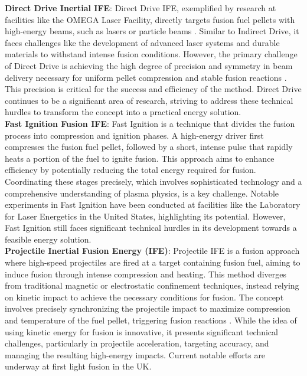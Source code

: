 \textbf{Direct Drive Inertial IFE}: Direct Drive IFE, exemplified by research at facilities like the OMEGA Laser Facility, directly targets fusion fuel pellets with high-energy beams, such as lasers or particle beams \cite{soures1996direct}. Similar to Indirect Drive, it faces challenges like the development of advanced laser systems and durable materials to withstand intense fusion conditions. However, the primary challenge of Direct Drive is achieving the high degree of precision and symmetry in beam delivery necessary for uniform pellet compression and stable fusion reactions \cite{bodner1998direct}. This precision is critical for the success and efficiency of the method. Direct Drive continues to be a significant area of research, striving to address these technical hurdles to transform the concept into a practical energy solution.\\




\textbf{Fast Ignition Fusion IFE}: Fast Ignition is a technique that divides the fusion process into compression and ignition phases. A high-energy driver first compresses the fusion fuel pellet, followed by a short, intense pulse that rapidly heats a portion of the fuel to ignite fusion. This approach aims to enhance efficiency by potentially reducing the total energy required for fusion. Coordinating these stages precisely, which involves sophisticated technology and a comprehensive understanding of plasma physics, is a key challenge. Notable experiments in Fast Ignition have been conducted at facilities like the Laboratory for Laser Energetics in the United States, highlighting its potential. However, Fast Ignition still faces significant technical hurdles in its development towards a feasible energy solution.\\



\textbf{Projectile Inertial Fusion Energy (IFE)}: Projectile IFE is a fusion approach where high-speed projectiles are fired at a target containing fusion fuel, aiming to induce fusion through intense compression and heating. This method diverges from traditional magnetic or electrostatic confinement techniques, instead relying on kinetic impact to achieve the necessary conditions for fusion. The concept involves precisely synchronizing the projectile impact to maximize compression and temperature of the fuel pellet, triggering fusion reactions \cite{jha2020incomplete}. While the idea of using kinetic energy for fusion is innovative, it presents significant technical challenges, particularly in projectile acceleration, targeting accuracy, and managing the resulting high-energy impacts. Current notable efforts are underway at first light fusion in the UK.








